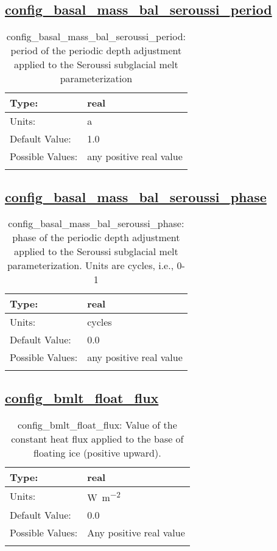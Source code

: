\subsection[config\_basal\_mass\_bal\_seroussi\_period]{\hyperref[sec:nm_tab_thermal_solver]{config\_basal\_mass\_bal\_seroussi\_period}}
\label{subsec:nm_sec_config_basal_mass_bal_seroussi_period}
\begin{center}
\begin{longtable}{| p{2.0in} || p{4.0in} |}
    \hline
    Type: & real \\
    \hline
    Units: & \si{a} \\
    \hline
    Default Value: & 1.0 \\
    \hline
    Possible Values: & any positive real value \\
    \hline
    \caption{config\_basal\_mass\_bal\_seroussi\_period: period of the periodic depth adjustment applied to the Seroussi subglacial melt parameterization}
\end{longtable}
\end{center}
\subsection[config\_basal\_mass\_bal\_seroussi\_phase]{\hyperref[sec:nm_tab_thermal_solver]{config\_basal\_mass\_bal\_seroussi\_phase}}
\label{subsec:nm_sec_config_basal_mass_bal_seroussi_phase}
\begin{center}
\begin{longtable}{| p{2.0in} || p{4.0in} |}
    \hline
    Type: & real \\
    \hline
    Units: & \si{cycles} \\
    \hline
    Default Value: & 0.0 \\
    \hline
    Possible Values: & any positive real value \\
    \hline
    \caption{config\_basal\_mass\_bal\_seroussi\_phase: phase of the periodic depth adjustment applied to the Seroussi subglacial melt parameterization. Units are cycles, i.e., 0-1}
\end{longtable}
\end{center}
\subsection[config\_bmlt\_float\_flux]{\hyperref[sec:nm_tab_thermal_solver]{config\_bmlt\_float\_flux}}
\label{subsec:nm_sec_config_bmlt_float_flux}
\begin{center}
\begin{longtable}{| p{2.0in} || p{4.0in} |}
    \hline
    Type: & real \\
    \hline
    Units: & \si{W.m^{-2}} \\
    \hline
    Default Value: & 0.0 \\
    \hline
    Possible Values: & Any positive real value \\
    \hline
    \caption{config\_bmlt\_float\_flux: Value of the constant heat flux applied to the base of floating ice (positive upward).}
\end{longtable}
\end{center}
